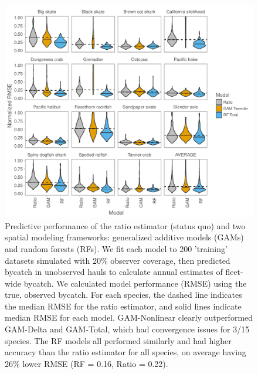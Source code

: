 \documentclass[]{article}
\begin{document}
\begin{figure}

{\centering \includegraphics{bycatch_sim_paper_sepsupp_files/figure-latex/model-comparison-1} 

}

\caption{Predictive performance of the ratio estimator (status quo) and two spatial modeling frameworks: generalized additive models (GAMs) and random forests (RFs). We fit each model to 200 'training' datasets simulated with 20\% observer coverage, then predicted bycatch in unobserved hauls to calculate annual estimates of fleet-wide bycatch. We calculated model performance (RMSE) using the true, observed bycatch. For each species, the dashed line indicates the median RMSE for the ratio estimator, and solid lines indicate median RMSE for each model. GAM-Nonlinear clearly outperformed GAM-Delta and GAM-Total, which had convergence issues for 3/15 species. The RF models all performed similarly and had higher accuracy than the ratio estimator for all species, on average having 26\% lower RMSE (RF = 0.16, Ratio = 0.22).}\label{fig:model-comparison}
\end{figure}

\pagebreak
\end{document}
